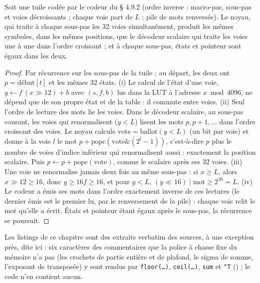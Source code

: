 \begin{theoreme}\label{thm:t2n-warp}
Soit une tuile codée par le codeur du § 4.9.2 (ordre inverse : macro-pas, sous-pas et voies décroissants ; chaque voie part de $L$ ; pile de mots renversée). Le noyau, qui traite à chaque sous-pas les 32 voies simultanément, produit les mêmes symboles, dans les mêmes positions, que le décodeur scalaire qui traite les voies une à une dans l'ordre croissant ; et à chaque sous-pas, états et pointeur sont égaux dans les deux.
\end{theoreme}

\begin{proof}
Par récurrence sur les sous-pas de la tuile ; au départ, les deux ont $p = \text{début}[t]$ et les mêmes 32 états.
(i) Le calcul de l'état d'une voie, $y \leftarrow f\,(x \gg 12) + b$ avec $(s, f, b)$ lus dans la LUT à l'adresse $x \bmod \num{4096}$, ne dépend que de son propre état et de la table : il commute entre voies.
(ii) Seul l'ordre de lecture des mots lie les voies. Dans le décodeur scalaire, au sous-pas courant, les voies qui renormalisent ($y < L$) lisent les mots $p, p+1, \ldots$ dans l'ordre croissant des voies. Le noyau calcule $\mathrm{vote} = \mathrm{ballot}(y < L)$ (un bit par voie) et donne à la voie $l$ le mot $p + \mathrm{popc}(\mathrm{vote} \mathbin{\&} (2^l - 1))$, c'est-à-dire $p$ plus le nombre de voies d'indice inférieur qui renormalisent aussi : exactement la position scalaire. Puis $p \leftarrow p + \mathrm{popc}(\mathrm{vote})$, comme le scalaire après ses 32 voies.
(iii) Une voie ne renormalise jamais deux fois au même sous-pas : si $x \ge L$, alors $x \gg 12 \ge 16$, donc $y \ge 16 f \ge 16$, et pour $y < L$, $(y \ll 16) \mathbin{|} \text{mot} \ge 2^{16} = L$.
(iv) Le codeur a émis ses mots dans l'ordre exactement inverse de ces lectures (le dernier émis est le premier lu, par le renversement de la pile) : chaque voie relit le mot qu'elle a écrit. États et pointeur étant égaux après le sous-pas, la récurrence se poursuit.
\end{proof}

Les listings de ce chapitre sont des extraits verbatim des sources, à une exception près, dite ici : six caractères des commentaires que la police à chasse fixe du mémoire n'a pas (les crochets de partie entière et de plafond, le sigma de somme, l'exposant de transposée) y sont rendus par \texttt{floor(\ldots)}, \texttt{ceil(\ldots)}, \texttt{sum} et \texttt{\^{}T} () ; le code n'en contient aucun.

